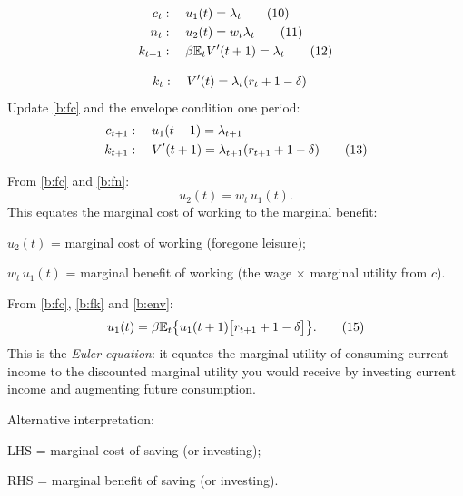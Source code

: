 \documentclass[11pt]{article}
\begin{document}
\begin{align}
  c_t &:\quad u_1(t)=\lambda_t \tag{10}\label{b:fc}\\
  n_t &:\quad u_2(t)=w_t\lambda_t \tag{11}\label{b:fn}\\
  k_{t+1} &:\quad \beta\mathbb{E}_tV'(t+1)=\lambda_t \tag{12}\label{b:fk}
\end{align}

\begin{align*}
  k_t &:\quad V'(t)=\lambda_t(r_t+1-\delta)
\end{align*}
Update \eqref{b:fc} and the envelope condition one period:
\begin{align}
  c_{t+1} &:\quad u_1(t+1)=\lambda_{t+1} \notag\\
  k_{t+1} &:\quad V'(t+1)=\lambda_{t+1}(r_{t+1}+1-\delta) \tag{13}\label{b:env}
\end{align}


 From \eqref{b:fc} and \eqref{b:fn}:
\begin{equation}
  u_2(t)=w_t\,u_1(t). \tag{14}\label{b:intra}
\end{equation}
This equates the marginal cost of working to the marginal benefit:
\begin{flatlist}
  \item $u_2(t)$ = marginal cost of working (foregone leisure);
  \item $w_t\,u_1(t)$ = marginal benefit of working (the wage $\times$ marginal utility
        from $c$).
\end{flatlist}

 From \eqref{b:fc}, \eqref{b:fk} and \eqref{b:env}:
\begin{equation}
  u_1(t)=\beta\mathbb{E}_t\bigl\{u_1(t+1)\bigl[r_{t+1}+1-\delta\bigr]\bigr\}. \tag{15}\label{b:euler}
\end{equation}
This is the \emph{Euler equation}: it equates the marginal utility of consuming current
income to the discounted marginal utility you would receive by investing current income
and augmenting future consumption.

Alternative interpretation:
\begin{flatlist}
  \item LHS = marginal cost of saving (or investing);
  \item RHS = marginal benefit of saving (or investing).
\end{flatlist}
\end{document}
